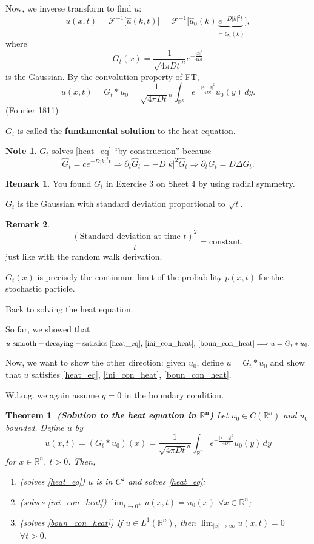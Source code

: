 \documentclass[12pt]{article}
\newtheorem{theorem}{Theorem}[section]
\theoremstyle{definition}
\newtheorem*{remark}{Remark}
\newtheorem*{note}{Note}
\begin{document}
Now, we inverse transform to find $u$:
\[u(x,t)=\mathcal{F}^{-1}\big[\hat{u}(k,t)\big]=\mathcal{F}^{-1}\big[\hat{u}_0(k)\underbrace{e^{-D|k|^2t}}_{=\widehat{G}_t(k)}\big],\]
where
\[G_t(x)=\frac{1}{\sqrt{4\pi Dt}^n}e^{-\frac{|x|^2}{4Dt}}\]
is the Gaussian. By the convolution property of FT,
\[u(x,t)=G_t*u_0=\frac{1}{\sqrt{4\pi Dt}^n}\int_{\mathbb{R}^n}e^{-\frac{|x-y|^2}{4Dt}}u_0(y)\,dy.\]
(Fourier 1811)

$G_t$ is called the \textbf{fundamental solution} to the heat equation.

\begin{note}
$G_t$ solves \eqref{heat_eq} ``by construction'' because
\[\widehat{G}_t=ce^{-D|k|^2t}\Longrightarrow\partial_t\widehat{G}_t=-D|k|^2\widehat{G}_t\Longrightarrow\partial_tG_t=D\Delta G_t.\]
\end{note}

\begin{remark}
You found $G_t$ in Exercise 3 on Sheet 4 by using radial symmetry.
\end{remark}

$G_t$ is the Gaussian with standard deviation proportional to $\sqrt{t}$.

\begin{remark}
\[\frac{(\text{Standard deviation at time }t)^2}{t}=\text{constant},\]
just like with the random walk derivation.

$G_t(x)$ is precisely the continuum limit of the probability $p(x,t)$ for the stochastic particle.
\end{remark}

Back to solving the heat equation.

So far, we showed that
\[u\text{ smooth}+\text{decaying}+\text{satisfies \eqref{heat_eq}, \eqref{ini_con_heat}, \eqref{boun_con_heat}}\Longrightarrow u=G_t*u_0.\]

Now, we want to show the other direction: given $u_0$, define $u=G_t*u_0$ and show that $u$ satisfies \eqref{heat_eq}, \eqref{ini_con_heat}, \eqref{boun_con_heat}.

W.l.o.g. we again assume $g=0$ in the boundary condition.

\begin{theorem}\label{th_sol_heat}
\emph{\textbf{(Solution to the heat equation in $\boldsymbol{\mathbb{R}^n}$)}} Let $u_0\in C(\mathbb{R}^n)$ and $u_0$ bounded. Define $u$ by
\[u(x,t)=(G_t*u_0)(x)=\frac{1}{\sqrt{4\pi Dt}^n}\int_{\mathbb{R}^n}e^{-\frac{|x-y|^2}{4Dt}}u_0(y)\,dy\]
for $x\in\mathbb{R}^n$, $t>0$. Then,
\begin{enumerate}[label=(\arabic*)]
\item (solves \eqref{heat_eq}) $u$ is in $C^2$ and solves \eqref{heat_eq};
\item (solves \eqref{ini_con_heat}) $\displaystyle{\lim_{t\to0^+}u(x,t)=u_0(x)}$ $\forall x\in\mathbb{R}^n$;
\item  (solves \eqref{boun_con_heat}) If $u\in L^1(\mathbb{R}^n)$, then $\displaystyle{\lim_{|x|\to\infty}u(x,t)=0}$ $\forall t>0$.
\end{enumerate}
\end{theorem}
\end{document}
